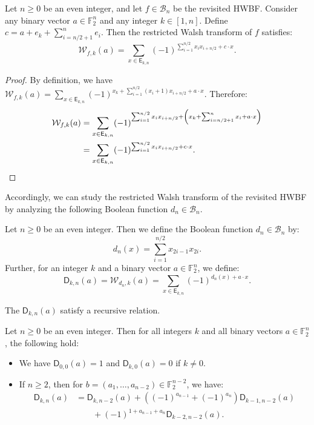 \documentclass[runningheads,orivec]{llncs}
\newcommand{\BN}{\mathcal{B}_n}
\newcommand{\Dkna}[3]{\mathsf{D}_{#2,#1}(a)}
\newcommand{\Ekn}[2]{\mathsf{E}_{#1,#2}}
\newcommand{\F}{\mathbb{F}}
\newcommand{\hwbf}{\textsf{HWBF}}
\newcommand{\wtk}[2]{\mathcal{W}_{#1,#2}}
\let\geq=\geqslant
\begin{document}
    \begin{proposition}\label{prop:restrWT}
    	Let $n\geq 0$ be an even integer, and let $f\in\BN$ be the revisited \hwbf{}. Consider any binary vector $a\in\F_2^n$ and any integer $k\in[1,n]$. Define $c=a+e_k+\sum_{i=n/2+1}^n e_i$. Then the restricted Walsh transform of $f$ satisfies:
    	\[
    		\wtk{f}{k}(a)=\sum_{x \in \Ekn{k}{n}} (-1)^{\sum_{i=1}^{n/2} x_i x_{i+n/2}+ c\cdot x}.
    	\]
    \end{proposition}
    
    \begin{proof}
    	By definition, we have $\wtk{f}{k}(a)=\sum_{x \in \Ekn{k}{n}} (-1)^{x_k + \sum_{i=1}^{n/2} (x_i+1) x_{i+n/2}+ a\cdot x}$. Therefore:
    	\begin{align*}
    		\wtk{f}{k}(a)&=\sum_{x \in \Ekn{k}{n}} (-1)^{\sum_{i=1}^{n/2} x_i x_{i+n/2}+\left(x_k+\sum_{i=n/2+1}^{n}x_i+a\cdot x\right)}\\
    		&=\sum_{x \in \Ekn{k}{n}} (-1)^{\sum_{i=1}^{n/2} x_i x_{i+n/2}+ c\cdot x}.\qedhere
    	\end{align*}
    \end{proof}
    
    Accordingly, we can study the restricted Walsh transform of the revisited \hwbf{} by analyzing the following Boolean function $d_n\in\BN$.
    
    \begin{definition}
    	Let $n\geq 0$ be an even integer. Then we define the Boolean function $d_n\in\BN$ by:
    	\[
    		d_n(x)=\sum_{i=1}^{n/2}x_{2i-1}x_{2i}.
    	\]
    	Further, for an integer $k$ and a binary vector $a\in\F_2^n$, we define:
    	\[
    		\Dkna{n}{k}{a}=\wtk{d_n}{k}(a)=\sum_{x\in \Ekn{k}{n}} (-1)^{d_n(x) +a\cdot x}.
    	\]
    \end{definition}
    
    The $\Dkna{n}{k}{a}$ satisfy a recursive relation.
    
    \begin{proposition}\label{prop:recursiveDkna}
    Let $n\geq 0$ be an even integer. Then for all integers $k$ and all binary vectors $a\in\F_2^n$, the following hold:
    	\begin{itemize}
    		\item We have $\Dkna 00a=1$ and $\Dkna 0ka=0$ if $k\neq 0$.
    		\item If $n\geq 2$, then for $b=(a_1,\dots,a_{n-2})\in\F_2^{n-2}$, we have:
    		\begin{align*}
    			\Dkna{n}{k}{a}&=\Dkna{n-2}{k}{b}+\left((-1)^{a_{n-1}} + (-1)^{a_{n}}\right)\Dkna{n-2}{k-1}{b}\\
    			&\qquad+ (-1)^{1+a_{n-1}+a_n} \Dkna{n-2}{k-2}{b}.
    		\end{align*}
    	\end{itemize}
    \end{proposition}
    
\end{document}
